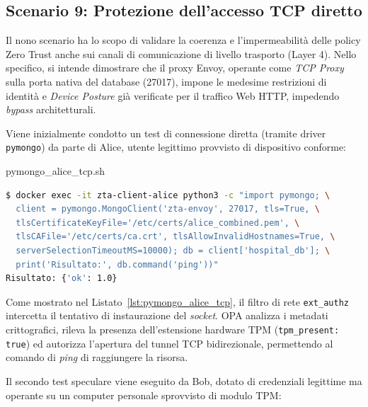 \subsection{Scenario 9: Protezione dell'accesso TCP diretto}
Il nono scenario ha lo scopo di validare la coerenza e l'impermeabilità delle policy Zero Trust anche sui canali di comunicazione di livello trasporto (Layer 4). Nello specifico, si intende dimostrare che il proxy Envoy, operante come \textit{TCP Proxy} sulla porta nativa del database (27017), impone le medesime restrizioni di identità e \textit{Device Posture} già verificate per il traffico Web HTTP, impedendo \textit{bypass} architetturali.

Viene inizialmente condotto un test di connessione diretta (tramite driver \texttt{pymongo}) da parte di Alice, utente legittimo provvisto di dispositivo conforme:

\begin{center}
\begin{minipage}{\linewidth}
\begin{ztacodebox}{pymongo\_alice\_tcp.sh}
\begin{lstlisting}[language=bash]
$ docker exec -it zta-client-alice python3 -c "import pymongo; \
  client = pymongo.MongoClient('zta-envoy', 27017, tls=True, \
  tlsCertificateKeyFile='/etc/certs/alice_combined.pem', \
  tlsCAFile='/etc/certs/ca.crt', tlsAllowInvalidHostnames=True, \
  serverSelectionTimeoutMS=10000); db = client['hospital_db']; \
  print('Risultato:', db.command('ping'))"
Risultato: {'ok': 1.0}
\end{lstlisting}
\end{ztacodebox}
\label{lst:pymongo_alice_tcp}
\end{minipage}
\end{center}

Come mostrato nel Listato~\ref{lst:pymongo_alice_tcp}, il filtro di rete \texttt{ext\_authz} intercetta il tentativo di instaurazione del \textit{socket}. OPA analizza i metadati crittografici, rileva la presenza dell'estensione hardware TPM (\texttt{tpm\_present: true}) ed autorizza l'apertura del tunnel TCP bidirezionale, permettendo al comando di \textit{ping} di raggiungere la risorsa.

Il secondo test speculare viene eseguito da Bob, dotato di credenziali legittime ma operante su un computer personale sprovvisto di modulo TPM:

